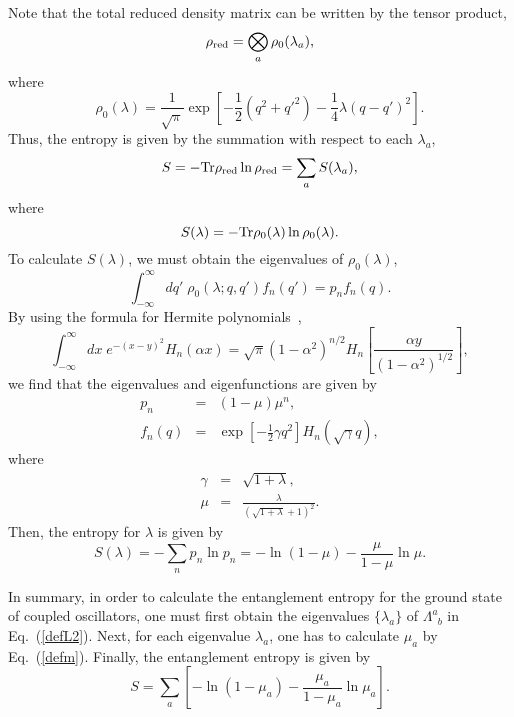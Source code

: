 \documentclass[12pt,epsf]{article}
\def\sp{\phantom{a}}
\begin{document}
Note that the total reduced density matrix can be 
written by the tensor product,
\begin{equation}
  \rho_{{\rm red}}=\bigotimes_a \rho_0(\lambda_a),
\end{equation}
where
\begin{equation}
\rho_0(\lambda)=
\frac{1}{\sqrt{\pi}}\exp\left[-\frac{1}{2}
  \left(q^2+q'^2\right)
-\frac{1}{4}\lambda\left(q-q'\right)^2\right].
\end{equation}
Thus, the entropy is given by
the summation with respect to each $\lambda_a$,
\begin{equation}
 S=-{\rm Tr}\rho_{{\rm red}}\ln\rho_{{\rm red}}
  =\sum_a S(\lambda_a),
\end{equation}
where
\begin{equation}
 S(\lambda)=-{\rm Tr}\rho_0(\lambda)\ln\rho_0(\lambda).
\end{equation}
To calculate $S(\lambda)$, we must obtain
the eigenvalues of $\rho_0(\lambda)$,
\begin{equation}
  \int^\infty_{-\infty}dq'\;\rho_0(\lambda;q,q')f_n(q')
   =p_nf_n(q).
\end{equation}
By using the formula for Hermite polynomials~\cite{GraRyz80},
\begin{equation}
\int^\infty_{-\infty}dx\;e^{-(x-y)^2}H_n(\alpha x)
  =\sqrt{\pi}\left(1-\alpha^2\right)^{n/2}H_n
  \left[\frac{\alpha y}{\left(1-\alpha^2\right)^{1/2}}
  \right],
\end{equation}
we find that the eigenvalues and
eigenfunctions are given by~\cite{Sredni93}
\begin{eqnarray}
  p_n    &=& (1-\mu)\mu^n,          \\
  f_n(q) &=&  \exp\left[-\frac{1}{2}\gamma q^2\right]
              H_n(\sqrt{\gamma}q),
\end{eqnarray}
where
\begin{eqnarray}
   \gamma &=& \sqrt{1+\lambda}, \\
   \mu &=& \frac{\lambda}{\left(\sqrt{1+\lambda}+1\right)^2}.
   \label{defm}
\end{eqnarray}
Then, the entropy for $\lambda$ is given by
\begin{equation}
 S(\lambda)=-\sum_np_n\ln p_n=-\ln(1-\mu)-\frac{\mu}{1-\mu}\ln\mu.
\label{defS}
\end{equation}

In summary,
in order to calculate the entanglement entropy
for the ground state of coupled oscillators,
one must first obtain the eigenvalues $\{\lambda_a\}$ of 
$\Lambda^a_{\sp b}$ in Eq.~(\ref{defL2}).
Next, for each eigenvalue $\lambda_a$,
one has to calculate $\mu_a$ by Eq.~(\ref{defm}).
Finally, the entanglement entropy is given by
\begin{equation}
  S=\sum_a\left[-\ln(1-\mu_a)-\frac{\mu_a}{1-\mu_a}\ln\mu_a\right].
\end{equation}
\end{document}
